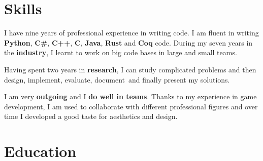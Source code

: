 \documentclass[letterpaper]{twentysecondcv} %
\begin{document}

\makeprofile %


\section{Skills}

I have nine years of professional experience in writing code. I am fluent in writing \textbf{Python}, \textbf{C\#}, \textbf{C++}, \textbf{C}, \textbf{Java}, \textbf{Rust} and \textbf{Coq} code. During my seven years in the \textbf{industry}, I learnt to work on big code bases in large and small teams.

Having spent two years in \textbf{research}, I can study complicated problems and then design, implement, evaluate, document and finally present my solutions.

I am very \textbf{outgoing} and I \textbf{do well in teams}. Thanks to my experience in game development, I am used to collaborate with different professional figures and over time I developed a good taste for aesthetics and design.\\





\section{Education}

\begin{twenty} %
\end{twenty}
\end{document}
